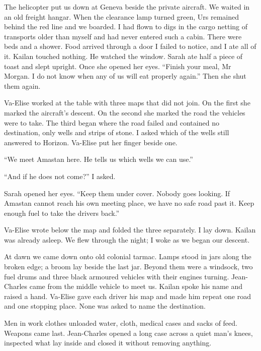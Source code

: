 The helicopter put us down at Geneva beside the private aircraft. We waited in an old freight hangar. When the clearance lamp turned green, Urs remained behind the red line and we boarded. I had flown to digs in the cargo netting of transports older than myself and had never entered such a cabin. There were beds and a shower. Food arrived through a door I failed to notice, and I ate all of it. Kailan touched nothing. He watched the window. Sarah ate half a piece of toast and slept upright. Once she opened her eyes. ``Finish your meal, Mr Morgan. I do not know when any of us will eat properly again.'' Then she shut them again.\par

Va-Elise worked at the table with three maps that did not join. On the first she marked the aircraft's descent. On the second she marked the road the vehicles were to take. The third began where the road failed and contained no destination, only wells and strips of stone. I asked which of the wells still answered to Horizon. Va-Elise put her finger beside one.\par

``We meet Amastan here. He tells us which wells we can use.''\par

``And if he does not come?'' I asked.\par

Sarah opened her eyes. ``Keep them under cover. Nobody goes looking. If Amastan cannot reach his own meeting place, we have no safe road past it. Keep enough fuel to take the drivers back.''\par

Va-Elise wrote below the map and folded the three separately. I lay down. Kailan was already asleep. We flew through the night; I woke as we began our descent.\par

\ornament

At dawn we came down onto old colonial tarmac. Lamps stood in jars along the broken edge; a broom lay beside the last jar. Beyond them were a windsock, two fuel drums and three black armoured vehicles with their engines turning. Jean-Charles came from the middle vehicle to meet us. Kailan spoke his name and raised a hand. Va-Elise gave each driver his map and made him repeat one road and one stopping place. None was asked to name the destination.\par

Men in work clothes unloaded water, cloth, medical cases and sacks of feed. Weapons came last. Jean-Charles opened a long case across a quiet man's knees, inspected what lay inside and closed it without removing anything.\par

